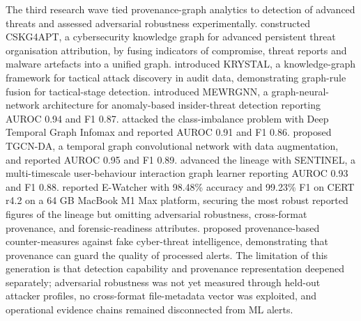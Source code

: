 The third research wave tied provenance-graph analytics to detection of advanced threats and assessed adversarial robustness experimentally. \citet{ren2022cskg4apt} constructed CSKG4APT, a cybersecurity knowledge graph for advanced persistent threat organisation attribution, by fusing indicators of compromise, threat reports and malware artefacts into a unified graph. \citet{kurniawan2022krystal} introduced KRYSTAL, a knowledge-graph framework for tactical attack discovery in audit data, demonstrating graph-rule fusion for tactical-stage detection. \citet{xiao2022robust} introduced MEWRGNN, a graph-neural-network architecture for anomaly-based insider-threat detection reporting AUROC 0.94 and F1 0.87. \citet{gao2023dtgi} attacked the class-imbalance problem with Deep Temporal Graph Infomax and reported AUROC 0.91 and F1 0.86. \citet{li2023tgcnda} proposed TGCN-DA, a temporal graph convolutional network with data augmentation, and reported AUROC 0.95 and F1 0.89. \citet{xiao2024sentinel} advanced the lineage with SENTINEL, a multi-timescale user-behaviour interaction graph learner reporting AUROC 0.93 and F1 0.88. \citet{wei2024ewatcher} reported E-Watcher with 98.48\% accuracy and 99.23\% F1 on CERT r4.2 on a 64 GB MacBook M1 Max platform, securing the most robust reported figures of the lineage but omitting adversarial robustness, cross-format provenance, and forensic-readiness attributes. \citet{mitra2021combating} proposed provenance-based counter-measures against fake cyber-threat intelligence, demonstrating that provenance can guard the quality of processed alerts. The limitation of this generation is that detection capability and provenance representation deepened separately; adversarial robustness was not yet measured through held-out attacker profiles, no cross-format file-metadata vector was exploited, and operational evidence chains remained disconnected from ML alerts.

